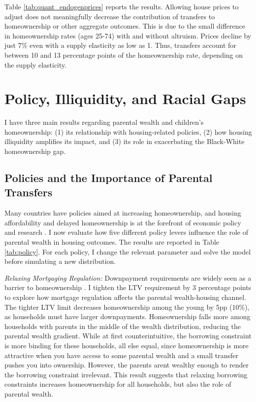 \documentclass[12pt]{article}
\begin{document}
Table \ref{tab:quant_endogenprices} reports the results. Allowing house prices to adjust does not meaningfully decrease the contribution of transfers to homeownership or other aggregate outcomes. This is due to the small difference in homeownership rates (ages 25-74) with and without altruism. Prices decline by just 7\% even with a supply elasticity as low as 1. Thus, transfers account for between 10 and 13 percentage points of the homeownership rate, depending on the supply elasticity.

\section{Policy, Illiquidity, and Racial Gaps}\label{sec:pol}
I have three main results regarding parental wealth and children's homeownership: (1) its relationship with housing-related policies, (2) how housing illiquidity amplifies its impact, and (3) its role in exacerbating the Black-White homeownership gap.

\subsection{Policies and the Importance of Parental Transfers}
Many countries have policies aimed at increasing homeownership, and housing affordability and delayed homeownership is at the forefront of economic policy and research \citep[see e.g.,][]{Mabille2020}. I now evaluate how five different policy levers influence the role of parental wealth in housing outcomes. The results are reported in Table \ref{tab:policy}. For each policy, I change the relevant parameter and solve the model before simulating a new distribution.

\textit{Relaxing Mortgaging Regulation:} Downpayment requirements are widely seen as a barrier to homeownership \citep[see e.g.,][]{Lee2018,Guiso2002}. I tighten the LTV requirement by 3 percentage points to explore how mortgage regulation affects the parental wealth-housing channel. The tighter LTV limit decreases homeownership among the young by 5pp (10\%), as households must have larger downpayments. Homeownership falls more among households with parents in the middle of the wealth distribution, reducing the parental wealth gradient. While at first counterintuitive, the borrowing constraint is more binding for these households, all else equal, since homeownership is more attractive when you have access to some parental wealth and a small transfer pushes you into ownership. However, the parents arent wealthy enough to render the borrowing constraint irrelevant. This result suggests that relaxing borrowing constraints increases homeownership for all households, but also the role of parental wealth.
\end{document}
